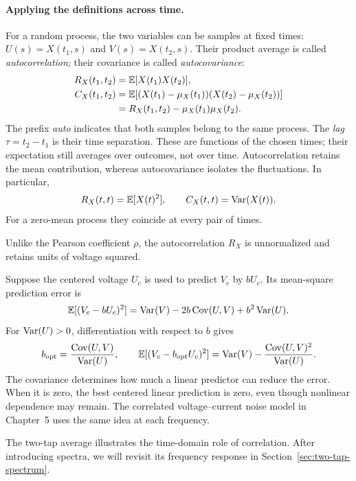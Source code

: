 \paragraph{Applying the definitions across time.}
For a random process, the two variables can be samples at fixed times:
$U(s)=X(t_1,s)$ and $V(s)=X(t_2,s)$. Their product average is called \emph{autocorrelation}; their covariance is called \emph{autocovariance}:
\begin{align}
R_X(t_1,t_2)&=\mathbb E[X(t_1)X(t_2)],\label{eq:autocorr}\\
C_X(t_1,t_2)&=\mathbb E[(X(t_1)-\mu_X(t_1))(X(t_2)-\mu_X(t_2))]\notag\\
&=R_X(t_1,t_2)-\mu_X(t_1)\mu_X(t_2).
\label{eq:covariance}
\end{align}
The prefix \emph{auto} indicates that both samples belong to the same process. The \emph{lag} $\tau=t_2-t_1$ is their time separation. These are functions of the chosen times; their expectation still averages over outcomes, not over time. Autocorrelation retains the mean contribution, whereas autocovariance isolates the fluctuations. In particular,
\[
R_X(t,t)=\mathbb E[X(t)^2],\qquad C_X(t,t)=\operatorname{Var}(X(t)).
\]
For a zero-mean process they coincide at every pair of times.

Unlike the Pearson coefficient $\rho$, the autocorrelation $R_X$ is unnormalized and retains units of voltage squared.

\begin{derivation}[title={Further connection: covariance and linear prediction}]
Suppose the centered voltage $U_c$ is used to predict $V_c$ by $bU_c$. Its mean-square prediction error is
\[
\mathbb E[(V_c-bU_c)^2]
=\operatorname{Var}(V)-2b\operatorname{Cov}(U,V)+b^2\operatorname{Var}(U).
\]
For $\operatorname{Var}(U)>0$, differentiation with respect to $b$ gives
\[
b_{\mathrm{opt}}=\frac{\operatorname{Cov}(U,V)}{\operatorname{Var}(U)},\qquad
\mathbb E[(V_c-b_{\mathrm{opt}}U_c)^2]
=\operatorname{Var}(V)-\frac{\operatorname{Cov}(U,V)^2}{\operatorname{Var}(U)}.
\]
The covariance determines how much a linear predictor can reduce the error. When it is zero, the best centered linear prediction is zero, even though nonlinear dependence may remain. The correlated voltage--current noise model in Chapter~5 uses the same idea at each frequency.
\end{derivation}

The two-tap average illustrates the time-domain role of correlation. After introducing spectra, we will revisit its frequency response in Section~\ref{sec:two-tap-spectrum}.

